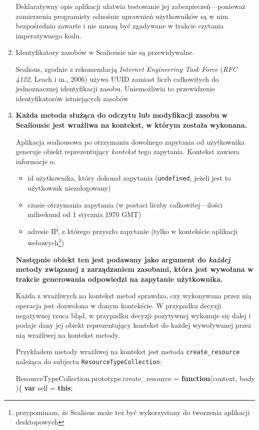 \documentclass[12pt,polish,a4paper,]{report}
\newenvironment{Shaded}{}{}
\newcommand{\KeywordTok}[1]{\textcolor[rgb]{0.00,0.44,0.13}{\textbf{{#1}}}}
\newcommand{\VariableTok}[1]{\textcolor[rgb]{0.10,0.09,0.49}{{#1}}}
\newcommand{\OperatorTok}[1]{\textcolor[rgb]{0.40,0.40,0.40}{{#1}}}
\newcommand{\AttributeTok}[1]{\textcolor[rgb]{0.49,0.56,0.16}{{#1}}}
\newcommand{\NormalTok}[1]{{#1}}
\providecommand{\tightlist}{%
  \setlength{\itemsep}{0pt}\setlength{\parskip}{0pt}}
\begin{document}
\begin{enumerate}
  Deklaratywny opis aplikacji ułatwia testowanie jej
  zabezpieczeń---ponieważ zamierzenia programisty odnośnie uprawnień
  użytkowników są w nim bezpośrednio zawarte i nie muszą być zgadywane w
  trakcie czytania imperatywnego kodu.
\item
  Identyfikatory zasobów w Sealiousie nie są przewidywalne.

  Sealious, zgodnie z rekomendacją \emph{Internet Engineering Task
  Force} (\emph{RFC 4122}, Leach i in., 2006) używa UUID zamiast liczb
  całkowitych do jednoznacznej identyfikacji zasobu. Uniemożliwia to
  przewidzenie identyfikatorów istniejących zasobów
\item
  \textbf{Każda metoda służąca do odczytu lub modyfikacji zasobu w
  Sealiousie jest wrażliwa na kontekst, w którym została wykonana.}

  Aplikacja sealiousowa po otrzymaniu dowolnego zapytania od użytkownika
  generuje obiekt reprezentujący \emph{kontekst} tego zapytania.
  Kontekst zawiera informacje o:

  \begin{itemize}
  \tightlist
  \item
    id użytkownika, który dokonał zapytania (\texttt{undefined}, jeżeli
    jest to użytkownik niezalogowany)
  \item
    czasie otrzymania zapytania (w postaci liczby całkowitej---ilości
    milisekund od 1 stycznia 1970 GMT)
  \item
    adresie IP, z którego przyszło zapytanie (tylko w kontekście
    aplikacji webowych\footnote{przypominam, że Sealious może też być
      wykorzystany do tworzenia aplikacji desktopowych})
  \end{itemize}

  \textbf{Następnie obiekt ten jest podawany jako argument do
  \emph{każdej} metody związanej z zarządzaniem zasobami, która jest
  wywołana w trakcie generowania odpowiedzi na zapytanie użytkownika.}

  Każda z wrażliwych na kontekst metod sprawdza, czy wykonywana przez
  nią operacja jest dozwolona w danym kontekście. W przypadku decyzji
  negatywnej rzuca błąd, w przypadku decyzji pozytywnej wykonuje się
  dalej i podaje dany jej obiekt reprezentujący kontekst do każdej
  wywoływanej przez nią wrażliwej na kontekst metody.

  Przykładem metody wrażliwej na kontekst jest metoda
  \texttt{create\_resource} należąca do subjectu
  \texttt{ResourceTypeCollection}:

\begin{Shaded}
\begin{Highlighting}[]
\VariableTok{ResourceTypeCollection}\NormalTok{.}\VariableTok{prototype}\NormalTok{.}\AttributeTok{create_resource} \OperatorTok{=} 
  \KeywordTok{function}\NormalTok{(context}\OperatorTok{,} \NormalTok{body )}\OperatorTok{\{}
    \KeywordTok{var} \NormalTok{self }\OperatorTok{=} \KeywordTok{this}\OperatorTok{;}


\end{Highlighting}
\end{Shaded}
\end{enumerate}
\end{document}
